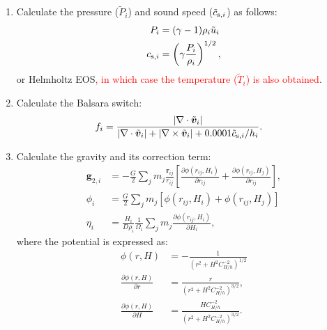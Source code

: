 \documentclass[fleqn,dvipdfmx]{article}
\newcommand{\redtext}[1]{\textcolor{red}{#1}}
\begin{document}
\begin{enumerate}
\item Calculate the pressure ($\tilde{P}_i$) and sound speed
  ($\tilde{c}_{{\rm s},i}$) as follows:
  \begin{align}
    P_i &= (\gamma - 1) \rho_i \tilde{u}_i \\
    c_{{\rm s},i} &= \left( \gamma \frac{P_i}{\rho_i} \right)^{1/2},
  \end{align}
  or Helmholtz EOS\redtext{, in which case the temperature
    ($\tilde{T}_i$) is also obtained}.

\item Calculate the Balsara switch:
  \begin{align}
    f_i &= \frac{|\nabla \cdot \tilde{\bm{v}}_i|}{|\nabla \cdot
      \tilde{\bm{v}}_i| + |\nabla \times \tilde{\bm{v}}_i| + 0.0001
      \tilde{c}_{{\rm s},i} / h_i}.
  \end{align}

\item Calculate the gravity and its correction term:
  \begin{align}
    \bm{g}_{2,i} &= - \frac{G}{2} \sum_j m_j
    \frac{\bm{r}_{ij}}{r_{ij}} \left[ \frac{\partial
        \phi(r_{ij},H_i)}{\partial r_{ij}} + \frac{\partial
        \phi(r_{ij},H_j)}{\partial r_{ij}} \right], \\
    \phi_i &= \frac{G}{2} \sum_j m_j \left[ \phi(r_{ij},H_i) +
      \phi(r_{ij},H_j) \right] \\
    \eta_i &= \frac{H_i}{D\rho_i} \frac{1}{\Omega_i} \sum_j m_j
    \frac{\partial \phi(r_{ij},H_i)}{\partial H_i},
  \end{align}
  where the potential is expressed as:
  \begin{align}
    \phi(r,H) &= - \frac{1}{\left( r^2 + H^2 C_{H/h}^{-2}
      \right)^{1/2}} \\
    \frac{\partial \phi(r,H)}{\partial r} &= \frac{r}{\left( r^2 + H^2
      C_{H/h}^{-2} \right)^{3/2}}, \\
    \frac{\partial \phi(r,H)}{\partial H} &=
    \frac{HC_{H/h}^{-2}}{\left( r^2 + H^2 C_{H/h}^{-2} \right)^{3/2}}.
  \end{align}


\end{enumerate}
\end{document}
